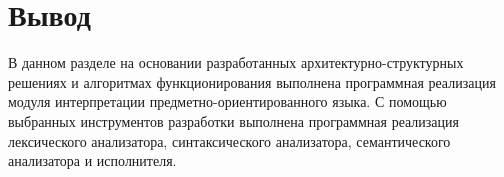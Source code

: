 




\section*{Вывод}

В данном разделе на основании разработанных архитектурно-структурных решениях и алгоритмах функционирования выполнена программная реализация модуля интерпретации предметно-ориентированного языка.
С помощью выбранных инструментов разработки выполнена программная реализация лексического анализатора, синтаксического анализатора, семантического анализатора и исполнителя.